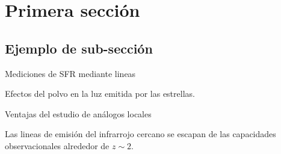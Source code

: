 \documentclass[
	spanish, %
	aspectratio=43, %
	hyperref={pdfencoding=auto,psdextra},
	xcolor={dvipsnames,table,usenames}
]{beamer}
\title[\documentsubtitle]{\documenttitle}
\subtitle{\documentsubject}
\author[\documentauthor]{
	\documentauthor
}
\institute[UChile]{
	\texttt{[image: \\universitydepartmentimage]} \\
	\medskip
	\universityname \\
	\universityfaculty \\
	\universitydepartment
}
\date[\today]{\footnotesize{\today}}
\begin{document}
\templatePagecfg

\templateFinalcfg


\begin{frame}
	\titlepage
\end{frame}


\section{Primera sección}

\subsection{Ejemplo de sub-sección}


\begin{frame}{Mediciones de SFR mediante lineas}
	
	
\end{frame}


\begin{frame}{Efectos del polvo en la luz emitida por las estrellas.}
	
	
\end{frame}




\begin{frame}{Ventajas del estudio de análogos locales}
	
	Las lineas de emisión del infrarrojo cercano se escapan de las capacidades observacionales alrededor de $z∼2$.
	
	
	
\end{frame}
\end{document}
